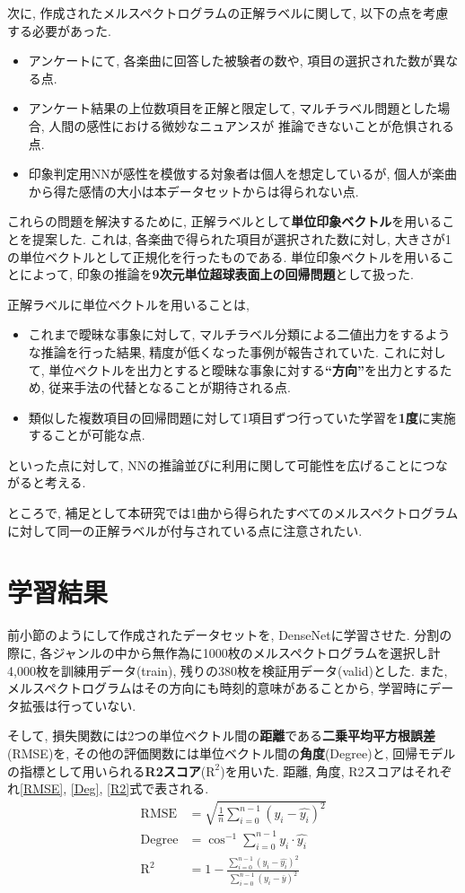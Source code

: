 \documentclass[a4paper,11pt,dvipdfmx]{jreport}
\begin{document}
次に, 作成されたメルスペクトログラムの正解ラベルに関して, 以下の点を考慮する必要があった.
\begin{itemize}
  \item アンケートにて, 各楽曲に回答した被験者の数や, 項目の選択された数が異なる点.
  \item アンケート結果の上位数項目を正解と限定して, マルチラベル問題とした場合, 人間の感性における微妙なニュアンスが
        推論できないことが危惧される点.
  \item 印象判定用NNが感性を模倣する対象者は個人を想定しているが, 個人が楽曲から得た感情の大小は本データセットからは得られない点. 
\end{itemize}
これらの問題を解決するために, 正解ラベルとして\textbf{単位印象ベクトル}を用いることを提案した.
これは, 各楽曲で得られた項目が選択された数に対し, 大きさが1の単位ベクトルとして正規化を行ったものである.
単位印象ベクトルを用いることによって, 印象の推論を\textbf{9次元単位超球表面上の回帰問題}として扱った. 

正解ラベルに単位ベクトルを用いることは, 
\begin{itemize}
  \item これまで曖昧な事象に対して, マルチラベル分類による二値出力をするような推論を行った結果, 精度が低くなった事例が報告されていた.
        これに対して, 単位ベクトルを出力とすると曖昧な事象に対する\textbf{``方向''}を出力とするため, 従来手法の代替となることが期待される点.
  \item 類似した複数項目の回帰問題に対して1項目ずつ行っていた学習を\textbf{1度}に実施することが可能な点.
\end{itemize}
といった点に対して, NNの推論並びに利用に関して可能性を広げることにつながると考える.

ところで, 補足として本研究では1曲から得られたすべてのメルスペクトログラムに対して同一の正解ラベルが付与されている点に注意されたい.

\section{学習結果}
\label{learning}
前小節のようにして作成されたデータセットを, DenseNetに学習させた.
分割の際に, 各ジャンルの中から無作為に1000枚のメルスペクトログラムを選択し計4,000枚を訓練用データ(train), 残りの380枚を検証用データ(valid)とした.
また, メルスペクトログラムはその方向にも時刻的意味があることから, 学習時にデータ拡張は行っていない.

\newpage
そして, 損失関数には2つの単位ベクトル間の\textbf{距離}である\textbf{二乗平均平方根誤差}(RMSE)を, その他の評価関数には単位ベクトル間の\textbf{角度}(Degree)と, 回帰モデルの指標として用いられる\textbf{R2スコア}($\mathrm{R^2}$)を用いた.
距離, 角度, R2スコアはそれぞれ\ref{RMSE}, \ref{Deg}, \ref{R2}式で表される.
\begin{align}
  \mathrm{RMSE}&= \sqrt{\frac{1}{n} \sum_{i=0}^{n-1} (y_i - \hat{y_i})^2}\label{RMSE} \\ 
  \mathrm{Degree} &= \cos^{-1}{\sum_{i=0}^{n-1}y_i \cdot \hat{y_i}}\label{Deg}\\
  \mathrm{R^2} &= 1 - \frac{\displaystyle \sum_{i=0}^{n-1}(y_i - \hat{y_i})^2}{\displaystyle \sum_{i=0}^{n-1}(y_i - \bar{y})^2}\label{R2}
\end{align}
\end{document}
